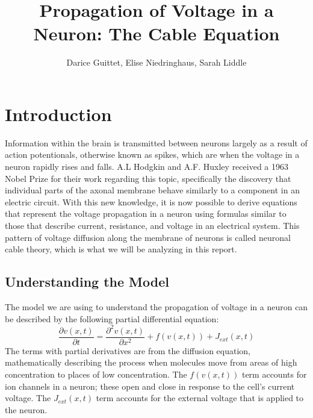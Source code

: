 \documentclass[12pt]{article}
\title{Propagation of Voltage in a Neuron: The Cable Equation}
\author{Darice Guittet, Elise Niedringhaus, Sarah Liddle}
\begin{document}
\maketitle
\section{Introduction}

Information within the brain is transmitted between neurons largely as a result of action potentionals, otherwise known as spikes, which are when the voltage in a neuron rapidly rises and falls. A.L Hodgkin and A.F. Huxley received a 1963 Nobel Prize for their work regarding this topic, specifically the discovery that individual parts of the axonal membrane behave similarly to a component in an electric circuit. With this new knowledge, it is now possible to derive equations that represent the voltage propagation in a neuron using formulas similar to those that describe current, resistance, and voltage in an electrical system. This pattern of voltage diffusion along the membrane of neurons is called neuronal cable theory, which is what we will be analyzing in this report.

\subsection{Understanding the Model}
The model we are using to understand the propagation of voltage in a neuron can be described by the following partial differential equation:
\begin{equation} \label{1}
\frac{\partial{v(x,t)}}{\partial{t}}=\frac{\partial^2{v(x,t)}}{\partial{x}^2}+f(v(x,t))+J_{ext}(x,t)
\end {equation}
The terms with partial derivatives are from the diffusion equation, mathematically describing the process when molecules move from areas of high concentration to places of low concentration. The $f(v(x,t))$ term accounts for ion channels in a neuron; these open and close in response to the cell's current voltage. The $J_{ext}(x,t)$ term accounts for the external voltage that is applied to the neuron. 
\end{document}
